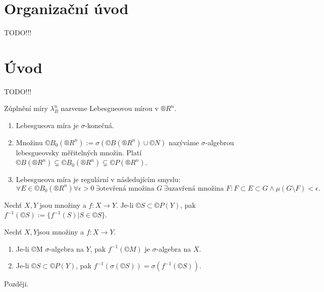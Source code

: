 \documentclass[12pt]{article}					%
\begin{document}

\section*{Organizační úvod}
	TODO!!!
\section*{Úvod}
	TODO!!!


\begin{definice}
	Zúplnění míry $\lambda^n_B$ nazveme Lebesgueovou mírou v $®R^n$.
\end{definice}

\begin{poznamka}
	\begin{enumerate}
		\item Lebesgueova míra je $\sigma$-konečná.
		\item Množinu $©B_0\left(®R^n\right) := \sigma(©B(®R^n)\cup©N)$ nazýváme $\sigma$-algebrou lebesgueovsky měřitelných množin. Platí $©B\left(®R^n\right)  \subsetneq ©B_0\left(®R^n\right) \subsetneq ©P\left(®R^n\right)$.
		\item Lebesgueova míra je regulární v následujícím smyslu:
			$$ \forall E \in ©B_0\left(®R^n\right) \forall \epsilon > 0\ \exists \text{otevřená množina } G\ \exists \text{uzavřená množina } F: F \subset E \subset G \land \mu(G \setminus F) < \epsilon. $$
	\end{enumerate}
\end{poznamka}

\begin{definice}[Značení]
	Nechť $X, Y$ jsou množiny a $f: X \rightarrow Y$. Je-li $©S \subset ©P(Y)$, pak $f^{-1}(©S) := \{f^{-1}(S) | S \in ©S\}$.
\end{definice}

\begin{veta}
	Nechť $X, Y$jsou množiny a $f: X \rightarrow Y$.

	\begin{enumerate}
		\item Je-li ©M $\sigma$-algebra na $Y$, pak $f^{-1}(©M)$ je $\sigma$-algebra na $X$.
		\item Je-li $©S \subset ©P(Y)$, pak $f^{-1}(\sigma(©S)) = \sigma\left(f^{-1}(©S)\right)$.
	\end{enumerate}

	\begin{dukazin}
		Později.
	\end{dukazin}
\end{veta}
\end{document}
